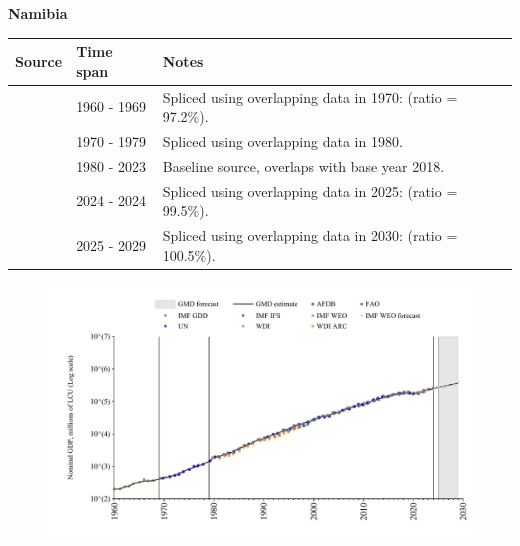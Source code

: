 \documentclass[12pt,a4paper,landscape]{article}
\begin{document}
\begin{adjustbox}{max totalsize={\paperwidth}{\paperheight},center}
\begin{minipage}[t][\textheight][t]{\textwidth}
\vspace*{0.5cm}
{}
\begin{center}
{\Large\bfseries Namibia}
\end{center}
\vspace{0.5cm}
\begin{table}[H]
\centering
\small
\begin{tabular}{|l|l|l|}
\hline
\textbf{Source} & \textbf{Time span} & \textbf{Notes} \\
\hline
\rowcolor{white}\cite{IMF_GDD}& 1960 - 1969 &Spliced using overlapping data in 1970: (ratio = 97.2\%).\\
\rowcolor{lightgray}\cite{UN}& 1970 - 1979 &Spliced using overlapping data in 1980.\\
\rowcolor{white}\cite{WDI}& 1980 - 2023 &Baseline source, overlaps with base year 2018.\\
\rowcolor{lightgray}\cite{IMF_IFS}& 2024 - 2024 &Spliced using overlapping data in 2025: (ratio = 99.5\%).\\
\rowcolor{white}\cite{IMF_WEO_forecast}& 2025 - 2029 &Spliced using overlapping data in 2030: (ratio = 100.5\%).\\
\hline
\end{tabular}
\end{table}
\begin{figure}[H]
\centering
\includegraphics[width=\textwidth,height=0.6\textheight,keepaspectratio]{graphs/NAM_nGDP.pdf}
\end{figure}
\end{minipage}
\end{adjustbox}
\end{document}
